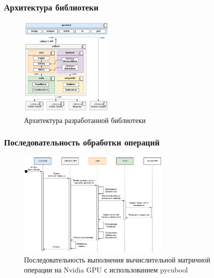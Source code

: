 \documentclass[aspectratio=169,xcolor=table,english]{beamer}
\begin{document}
\begin{frame}[fragile] \frametitle{Архитектура библиотеки}
    \begin{center}
    \begin{minipage}[m]{\linewidth}
        \begin{figure}
            \centering
            \includegraphics[width=0.4\textwidth]{figures/library_architecture.png}
            \caption{Архитектура разработанной библиотеки}
        \end{figure}
    \end{minipage}\hfill    
    \end{center}
\end{frame}

\begin{frame}[fragile] \frametitle{Последовательность обработки операций}
    \begin{center}
    \begin{minipage}[m]{0.85\linewidth}
        \begin{figure}
            \centering
            \includegraphics[width=0.65\textwidth]{figures/library_call_flow.png}
            \caption{Последовательность выполнения вычислительной матричной операции на Nvidia GPU с использованием pycubool}
        \end{figure}
    \end{minipage}\hfill    
    \end{center}
\end{frame}
\end{document}
